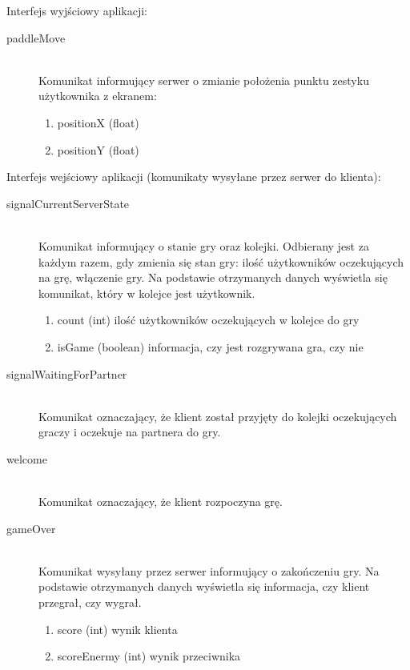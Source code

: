 Interfejs wyjściowy aplikacji:

\begin{description}
	\item[paddleMove] \hfill \\
	Komunikat informujący serwer o zmianie położenia punktu zestyku użytkownika z ekranem:
	\begin{enumerate}
		\item positionX (float)
		\item positionY (float)
	\end{enumerate}
\end{description}

Interfejs wejściowy aplikacji (komunikaty wysyłane przez serwer do klienta):

\begin{description}
	\item[signalCurrentServerState] \hfill \\
	Komunikat informujący o stanie gry oraz kolejki. Odbierany jest za każdym razem, gdy zmienia się stan gry: ilość użytkowników oczekujących na grę, włączenie gry. Na podstawie otrzymanych danych wyświetla się komunikat, który w kolejce jest użytkownik.
	\begin{enumerate}
		\item count (int) ilość użytkowników oczekujących w kolejce do gry
		\item isGame (boolean) informacja, czy jest rozgrywana gra, czy nie
	\end{enumerate}
\end{description}

\begin{description}
	\item[signalWaitingForPartner] \hfill \\
	Komunikat oznaczający, że klient został przyjęty do kolejki oczekujących graczy i oczekuje na partnera do gry.
\end{description}

\begin{description}
	\item[welcome] \hfill \\
	Komunikat oznaczający, że klient rozpoczyna grę.
\end{description}

\begin{description}
	\item[gameOver] \hfill \\
	Komunikat wysyłany przez serwer informujący o zakończeniu gry. Na podstawie otrzymanych danych wyświetla się informacja, czy klient przegrał, czy wygrał.
	\begin{enumerate}
		\item score (int) wynik klienta
		\item scoreEnermy (int) wynik przeciwnika
	\end{enumerate}
\end{description}
